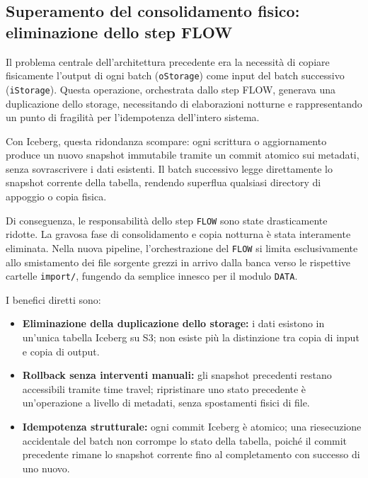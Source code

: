 \documentclass[12pt,a4paper,openright,twoside]{book}
\begin{document}
\subsection{Superamento del consolidamento fisico: eliminazione dello step FLOW}
\label{sec:eliminazione-flow}
Il problema centrale dell'architettura precedente era la necessità di copiare fisicamente l'output di ogni batch (\texttt{oStorage}) come input del batch successivo (\texttt{iStorage}).
Questa operazione, orchestrata dallo step FLOW, generava una duplicazione dello storage, necessitando di elaborazioni notturne e rappresentando un punto di fragilità per l'idempotenza dell'intero sistema.

Con Iceberg, questa ridondanza scompare: ogni scrittura o aggiornamento produce un nuovo snapshot immutabile tramite un commit atomico sui metadati, senza sovrascrivere i dati esistenti. 
Il batch successivo legge direttamente lo snapshot corrente della tabella, rendendo superflua qualsiasi directory di appoggio o copia fisica.

Di conseguenza, le responsabilità dello step \texttt{FLOW} sono state drasticamente ridotte. La gravosa fase di consolidamento e copia notturna è stata interamente eliminata. Nella nuova pipeline, l'orchestrazione del \texttt{FLOW} si limita esclusivamente allo smistamento dei file sorgente grezzi in arrivo dalla banca verso le rispettive cartelle \texttt{import/}, fungendo da semplice innesco per il modulo \texttt{DATA}.

I benefici diretti sono:

\begin{itemize}
    \item \textbf{Eliminazione della duplicazione dello storage:} i dati esistono in un'unica tabella Iceberg su S3; non esiste più la distinzione tra copia di input e copia di output.
    \item \textbf{Rollback senza interventi manuali:} gli snapshot precedenti restano accessibili tramite time travel; ripristinare uno stato precedente è un'operazione a livello di metadati, senza spostamenti fisici di file.
    \item \textbf{Idempotenza strutturale:} ogni commit Iceberg è atomico; una riesecuzione accidentale del batch non corrompe lo stato della tabella, poiché il commit precedente rimane lo snapshot corrente fino al completamento con successo di uno nuovo.
\end{itemize}
\end{document}
